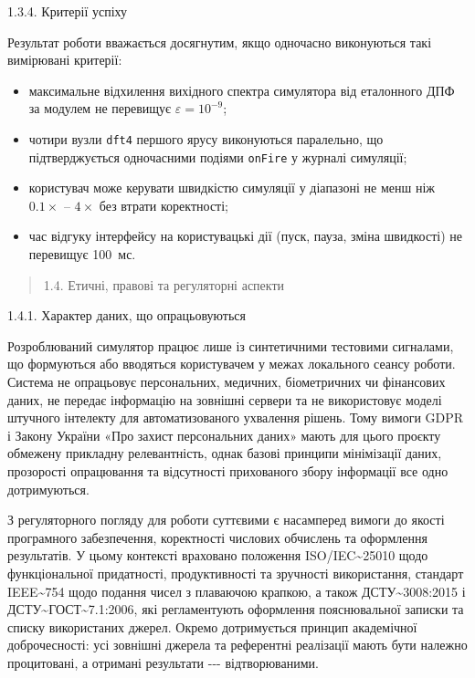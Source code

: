 1.3.4. Критерії успіху

Результат роботи вважається досягнутим, якщо одночасно виконуються такі
вимірювані критерії:

\begin{itemize}
\item
  максимальне відхилення вихідного спектра симулятора від еталонного ДПФ
  за модулем не перевищує \(\varepsilon = 10^{- 9}\);
\item
  чотири вузли \texttt{dft4} першого ярусу виконуються паралельно, що
  підтверджується одночасними подіями \texttt{onFire} у журналі
  симуляції;
\item
  користувач може керувати швидкістю симуляції у діапазоні не менш ніж
  \(0.1 \times\) -- \(4 \times\) без втрати коректності;
\item
  час відгуку інтерфейсу на користувацькі дії (пуск, пауза, зміна
  швидкості) не перевищує 100~мс.
\end{itemize}

\begin{quote}
\protect{}\label{_Toc229682908}{}1.4. Етичні, правові та
регуляторні аспекти
\end{quote}

1.4.1. Характер даних, що опрацьовуються

Розроблюваний симулятор працює лише із синтетичними тестовими сигналами,
що формуються або вводяться користувачем у межах локального сеансу
роботи. Система не опрацьовує персональних, медичних, біометричних чи
фінансових даних, не передає інформацію на зовнішні сервери та не
використовує моделі штучного інтелекту для автоматизованого ухвалення
рішень. Тому вимоги GDPR і Закону України «Про захист персональних
даних» мають для цього проєкту обмежену прикладну релевантність, однак
базові принципи мінімізації даних, прозорості опрацювання та відсутності
прихованого збору інформації все одно дотримуються.

З регуляторного погляду для роботи суттєвими є насамперед вимоги до
якості програмного забезпечення, коректності числових обчислень та
оформлення результатів. У цьому контексті враховано положення
ISO/IEC\textasciitilde25010 щодо функціональної придатності,
продуктивності та зручності використання, стандарт
IEEE\textasciitilde754 щодо подання чисел з плаваючою крапкою, а також
ДСТУ\textasciitilde3008:2015 і
ДСТУ\textasciitilde ГОСТ\textasciitilde7.1:2006, які регламентують
оформлення пояснювальної записки та списку використаних джерел. Окремо
дотримується принцип академічної доброчесності: усі зовнішні джерела та
референтні реалізації мають бути належно процитовані, а отримані
результати -\/-\/- відтворюваними.

